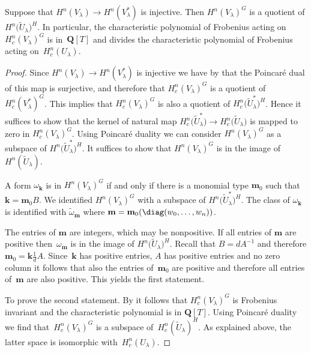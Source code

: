\begin{Proposition}\label{prpFactor} Suppose that $H^n(V_\lambda)\to H^n(V_{\lambda}^*)$ is injective. Then $H^n(V_{\lambda})^G$ is a quotient of $H^n\big(\tilde{U}_{\lambda}\big)^H$. In particular, the characteristic polynomial of Frobenius acting on $H^n_c(V_{\lambda})^G$ is in~$\mathbf{Q}[T]$ and divides the characteristic polynomial of Frobenius acting on~$H^n_c(U_{\lambda})$.
\end{Proposition}

\begin{proof}Since $H^n(V_\lambda)\to H^n(V_{\lambda}^*)$ is injective we have by \cite{BerPoi} that the Poincar\'e dual of this map is surjective, and therefore that $H^n_c(V_\lambda)^G$ is a quotient of~$H^n_c(V_\lambda^*)^G$. This implies that $H^n_c(V_\lambda)^G$ is also a quotient of $H^n_c\big(\tilde{U}^*_\lambda\big)^H$. Hence it suf\/f\/ices to show that the kernel of natural map $H^n_c\big(\tilde{U}^*_\lambda\big)\to H^n_c\big(\tilde{U}_\lambda\big)$ is mapped to zero in $H^n_c(V_\lambda)^G$. Using Poincar\'e duality we can consider $H^n(V_\lambda)^G$ as a subspace of $H^n\big(\tilde{U}_{\lambda}^*\big)^H$. It suf\/f\/ices to show that $H^n(V_\lambda)^G$ is in the image of~$H^n(\tilde{U}_\lambda)$.

A form $\omega_{\mathbf{k}}$ is in $H^n(V_\lambda)^G$ if and only if there is a monomial type $\mathbf{m}_0$ such that $\mathbf{k}=\mathbf{m}_0 B$. We identif\/ied $H^n(V_\lambda)^G$ with a subspace of $H^n\big(\tilde{U}_\lambda^*\big)^H$. The class of $\omega_{\mathbf{k}}$ is identif\/ied with $\tilde{\omega}_{\mathbf{m}}$ where $\mathbf{m}=\mathbf{m}_0(\diag(w_0,\dots,w_n))$.

The entries of $\mathbf{m}$ are integers, which may be nonpositive. If all entries of $\mathbf{m}$ are positive then~$\omega_{\mathbf{m}}$ is in the image of $H^n\big(\tilde{U}_{\lambda}\big)^ H$. Recall that $B=d A^{-1}$ and therefore $\mathbf{m}_0=\mathbf{k} \frac{1}{d} A $. Since~$\mathbf{k}$ has positive entries, $A$ has positive entries and no zero column it follows that also the entries of~$\mathbf{m}_0$ are positive and therefore all entries of~$\mathbf{m}$ are also positive. This yields the f\/irst statement.

To prove the second statement. By \cite[Lemma~4.3]{Zetafamrec} it follows that $H^n_c(V_\lambda)^G$ is Frobenius invariant and the characteristic polynomial is in $\mathbf{Q}[T]$. Using Poincar\'e duality we f\/ind that~$H^n_c(V_\lambda)^G$ is a subspace of~$H^n_c(\tilde{U}_\lambda)^H$. As explained above, the latter space is isomorphic with~$H^n_c(U_\lambda)$.
\end{proof}

